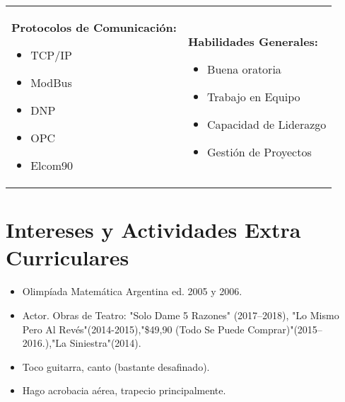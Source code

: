 \documentclass[11pt,a4paper,roman]{moderncv}        %
\begin{document}
	 \begin{tabular}{l l}		
		\begin{minipage}[t]{0.4\textwidth}	
			\vspace{6pt}
			\textbf{Protocolos de Comunicación:}
			\begin{itemize}
				\item TCP/IP
				\item ModBus
				\item DNP
				\item OPC
				\item Elcom90
			\end{itemize}
		\end{minipage}
	  &
		\begin{minipage}[t]{0.6\textwidth}	
			\vspace{6pt}
			\textbf{Habilidades Generales:}
			\begin{itemize}
				\item Buena oratoria
				\item Trabajo en Equipo
				\item Capacidad de Liderazgo
				\item Gestión de Proyectos
			\end{itemize}
		\end{minipage}			
	\end{tabular}

	\vspace{6pt}
	
	\section{Intereses y Actividades Extra Curriculares}
	
	\vspace{6pt}
	
	\begin{itemize}
		
		\item{Olimpíada Matemática Argentina ed. 2005 y 2006.}
		
		\vspace{6pt}
		
		\item{Actor. Obras de Teatro: "Solo Dame 5 Razones" (2017--2018), "Lo Mismo Pero Al Revés"(2014-2015),"\$49,90 (Todo Se Puede Comprar)"(2015--2016.),"La Siniestra"(2014).}
		
		\vspace{6pt}
		
		\item{Toco guitarra, canto (bastante desafinado).}
		
		\vspace{6pt}
		
		\item{Hago acrobacia aérea, trapecio principalmente.}
	\end{itemize}
	
\end{document}
